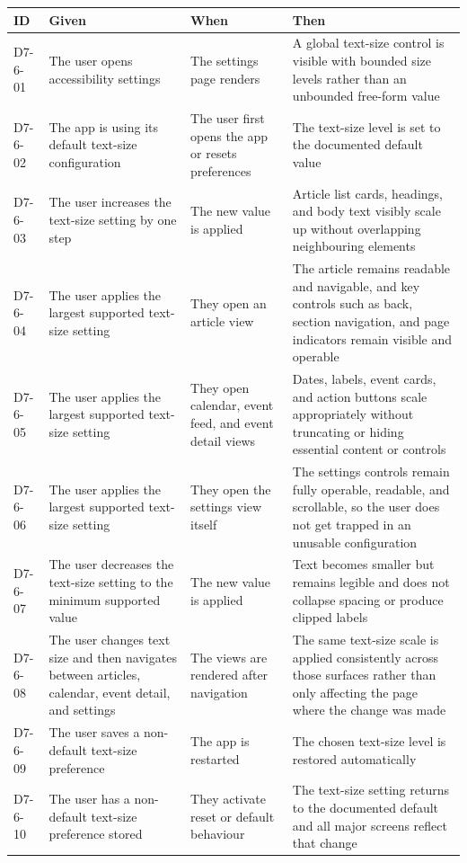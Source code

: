 \documentclass[a4paper, 12pt]{article}
\begin{document}
    \begin{longtable}
        {|L{0.12\textwidth}|L{0.24\textwidth}|L{0.24\textwidth}|L{0.32\textwidth}|}
        \hline \textbf{ID} & \textbf{Given} & \textbf{When} & \textbf{Then} \\
        \hline \endhead D7-6-01 & The user opens accessibility settings & The settings
        page renders & A global text-size control is visible with bounded size levels
        rather than an unbounded free-form value \\
        \hline D7-6-02 & The app is using its default text-size configuration & The
        user first opens the app or resets preferences & The text-size level is set
        to the documented default value \\
        \hline D7-6-03 & The user increases the text-size setting by one step & The
        new value is applied & Article list cards, headings, and body text visibly
        scale up without overlapping neighbouring elements \\
        \hline D7-6-04 & The user applies the largest supported text-size setting
        & They open an article view & The article remains readable and navigable,
        and key controls such as back, section navigation, and page indicators
        remain visible and operable \\
        \hline D7-6-05 & The user applies the largest supported text-size
        setting & They open calendar, event feed, and event detail views & Dates,
        labels, event cards, and action buttons scale appropriately without truncating
        or hiding essential content or controls \\
        \hline D7-6-06 & The user applies the largest supported text-size setting
        & They open the settings view itself & The settings controls remain fully
        operable, readable, and scrollable, so the user does not get trapped in
        an unusable configuration \\
        \hline D7-6-07 & The user decreases the text-size setting to the minimum
        supported value & The new value is applied & Text becomes smaller but
        remains legible and does not collapse spacing or produce clipped labels
        \\
        \hline D7-6-08 & The user changes text size and then navigates between
        articles, calendar, event detail, and settings & The views are rendered after
        navigation & The same text-size scale is applied consistently across those
        surfaces rather than only affecting the page where the change was made \\
        \hline D7-6-09 & The user saves a non-default text-size preference & The
        app is restarted & The chosen text-size level is restored automatically \\
        \hline D7-6-10 & The user has a non-default text-size preference stored &
        They activate reset or default behaviour & The text-size setting returns
        to the documented default and all major screens reflect that change \\
        \hline
    \end{longtable}
\end{document}
